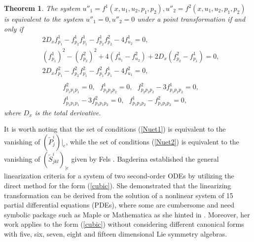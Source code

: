 \documentclass[12pt]{article}
\newtheorem{theorem}{Theorem}[section]
\begin{document}
\begin{theorem}\label{Nuet3} \cite{R5}
The system $u''_1=f^1(x,u_1,u_2,p_1,p_2),u''_2=f^2(x,u_1,u_2,p_1,p_2)$ is equivalent to the system $u''_1=0,u''_2=0$ under a point transformation if and only if
\begin{equation}\label{Nuet1}
\begin{aligned}
&2D_xf^1_{p_1}-f^1_{p_2}f^1_{p_1}-f^1_{p_2}f^2_{p_2}-4f^1_{u_2}=0,\\
&(f^1_{p_1})^2-(f^2_{p_2})^2+4(f^1_{u_1}-f^2_{u_2})+2D_x(f^2_{p_2}-f^1_{p_1})=0,\\
&2D_xf^2_{p_1}-f^2_{p_2}f^2_{p_1}-f^2_{p_1}f^1_{p_1}-4f^2_{u_1}=0,\\
\end{aligned}
\end{equation}
\begin{equation}\label{Nuet2}
\begin{aligned}
&f^2_{p_1p_1p_1}=0, ~~~f^1_{p_2p_2p_2}=0,~~~f^2_{p_2p_2p_2}-3f^1_{p_1p_2p_2}=0,\\
&f^1_{p_1p_1p_1}-3f^2_{p_1p_1p_2}=0,~~~f^1_{p_1p_1p_2}-f^2_{p_1p_2p_2}=0,
\end{aligned}
\end{equation}
where $D_x$ is the total derivative.\end{theorem}
 It is worth noting that the set of conditions (\ref{Nuet1}) is equivalent to the vanishing of $(\tilde{P}^{i}_{j})|_{e}$, while the set of conditions (\ref{Nuet2}) is equivalent to the vanishing of $(\tilde{S}^{i}_{jkl})_{|e}$ given by Fels \cite{p15}. Bagderina  established the general linearization criteria for a system of two 
 second-order ODEs by utilizing the direct method for the form (\ref{cubic}). She demonstrated that the linearizing transformation can be derived from the solution of a nonlinear system of 15 partial differential equations (PDEs), where some are cumbersome and need symbolic package such as Maple or Mathematica as she hinted in \cite[Remark 2]{p16}. Moreover, her work applies to the form (\ref{cubic}) without considering different canonical forms with five, six, seven, eight and fifteen dimensional Lie symmetry algebras.\\
\end{document}
